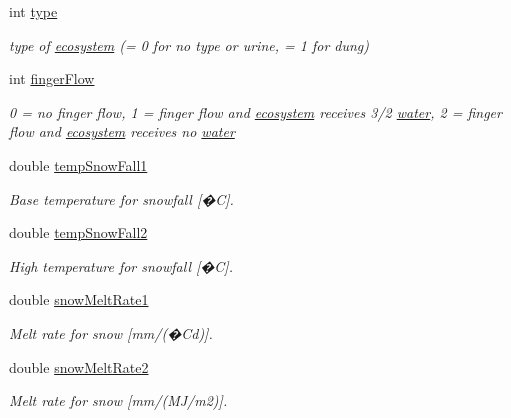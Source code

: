 \begin{DoxyCompactItemize}
int \hyperlink{classecosystem_a33c5d59a1b021f453ffad961f46cd0b7}{type}
\begin{DoxyCompactList}\small\item\em type of \hyperlink{classecosystem}{ecosystem} (= 0 for no type or urine, = 1 for dung) \item\end{DoxyCompactList}\item 
int \hyperlink{classecosystem_a27a6796874903c016e6cb3de4ec8a9d2}{fingerFlow}
\begin{DoxyCompactList}\small\item\em 0 = no finger flow, 1 = finger flow and \hyperlink{classecosystem}{ecosystem} receives 3/2 \hyperlink{classwater}{water}, 2 = finger flow and \hyperlink{classecosystem}{ecosystem} receives no \hyperlink{classwater}{water} \item\end{DoxyCompactList}\item 
double \hyperlink{classecosystem_a45ea3a5ece526455d6bc5942c90ac021}{tempSnowFall1}
\begin{DoxyCompactList}\small\item\em Base temperature for snowfall \mbox{[}�C\mbox{]}. \item\end{DoxyCompactList}\item 
double \hyperlink{classecosystem_aaad4a3984f8adec87aaac91fb8c153a1}{tempSnowFall2}
\begin{DoxyCompactList}\small\item\em High temperature for snowfall \mbox{[}�C\mbox{]}. \item\end{DoxyCompactList}\item 
double \hyperlink{classecosystem_a1ad645dd127e20417f1ad8e97ae75338}{snowMeltRate1}
\begin{DoxyCompactList}\small\item\em Melt rate for snow \mbox{[}mm/(�Cd)\mbox{]}. \item\end{DoxyCompactList}\item 
double \hyperlink{classecosystem_a5b694778f4af8dc19151098d90640fd8}{snowMeltRate2}
\begin{DoxyCompactList}\small\item\em Melt rate for snow \mbox{[}mm/(MJ/m2)\mbox{]}. \item\end{DoxyCompactList}\item 

\end{DoxyCompactItemize}
